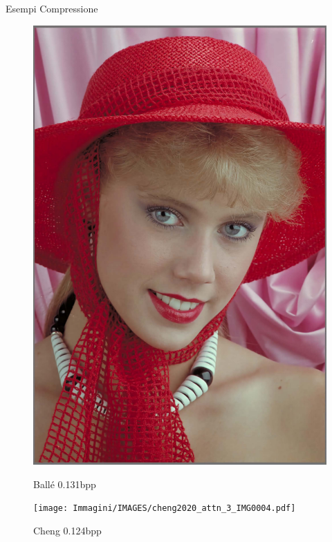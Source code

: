 \begin{frame}{Esempi Compressione}
\begin{figure}[!ht]
\begin{minipage}[]{0.13\linewidth}
                \includegraphics[width=\textwidth]{Immagini/IMAGES/mbt2018_3_IMG0004.pdf}
                \caption{Ballé 0.131bpp}
                \label{fig:ExampleBalle}
            \end{minipage}
            \begin{minipage}[]{0.13\linewidth}
                \centering
                \texttt{[image: Immagini/IMAGES/cheng2020\_attn\_3\_IMG0004.pdf]}
                \caption{Cheng 0.124bpp}
                \label{fig:ExampleCheng}
            \end{minipage}
            \label{fig:ExamplesCompression}
        \end{figure}
    \end{frame}

